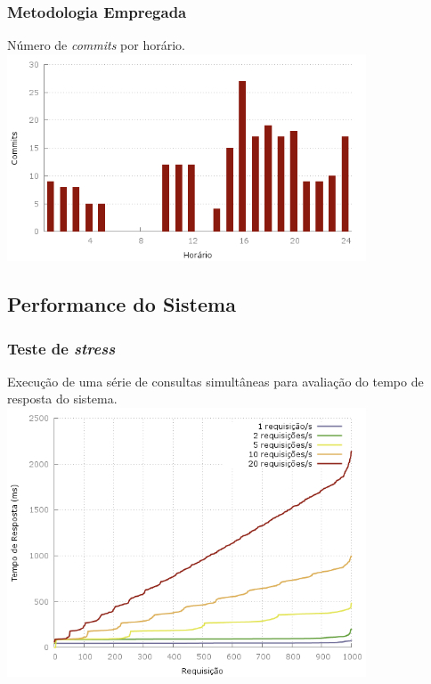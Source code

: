 \frame
{
\frametitle{Metodologia Empregada}
Número de \emph{commits} por horário.
\includegraphics[width=0.8\textwidth]{./imgs/hour_of_day.png}
}

\subsection{Performance do Sistema}
\frame
{
\frametitle{Teste de \emph{stress}}
Execução de uma série de consultas simultâneas para avaliação do tempo de resposta do sistema.
\includegraphics[width=0.8\textwidth]{./imgs/out.png}
}